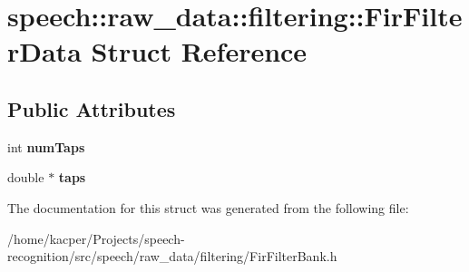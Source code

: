 \hypertarget{structspeech_1_1raw__data_1_1filtering_1_1FirFilterData}{\section{speech\+:\+:raw\+\_\+data\+:\+:filtering\+:\+:Fir\+Filter\+Data Struct Reference}
\label{structspeech_1_1raw__data_1_1filtering_1_1FirFilterData}
}
\subsection*{Public Attributes}
\begin{DoxyCompactItemize}
\item 
\hypertarget{structspeech_1_1raw__data_1_1filtering_1_1FirFilterData_ac54e8602d9ee04b36c382a6542d3a0c1}{int {\bfseries num\+Taps}}\label{structspeech_1_1raw__data_1_1filtering_1_1FirFilterData_ac54e8602d9ee04b36c382a6542d3a0c1}

\item 
\hypertarget{structspeech_1_1raw__data_1_1filtering_1_1FirFilterData_a91b76611e548be176a437e751036f23f}{double $\ast$ {\bfseries taps}}\label{structspeech_1_1raw__data_1_1filtering_1_1FirFilterData_a91b76611e548be176a437e751036f23f}

\end{DoxyCompactItemize}


The documentation for this struct was generated from the following file\+:\begin{DoxyCompactItemize}
\item 
/home/kacper/\+Projects/speech-\/recognition/src/speech/raw\+\_\+data/filtering/Fir\+Filter\+Bank.\+h\end{DoxyCompactItemize}
